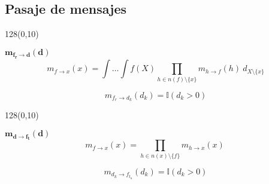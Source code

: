 \documentclass[shownotes]{beamer}
\newcommand\Wider[2][3em]{%
\makebox[\linewidth][c]{%
  \begin{minipage}{\dimexpr\textwidth+#1\relax}
  \raggedright#2
  \end{minipage}%
  }%
}
\begin{document}
\begin{frame}

\Wider[4em]{
\begin{figure}[H]
\centering
  \begin{subfigure}[b]{1\textwidth} 
  \centering
    \scalebox{0.8}{}
  \end{subfigure} 
\end{figure}
}

\pause
\vspace{0.75cm}

\Wider[4em]{
\begin{figure}[H]
\centering
  \begin{subfigure}[b]{1\textwidth} 
  \centering
    \scalebox{0.75}{}
  \end{subfigure} 
\end{figure}
}

\end{frame}

\subsection{Pasaje de mensajes}

\begin{frame}

\begin{textblock}{128}(0,10)
\begin{center}
 \large $\bm{m_{f_r \rightarrow d}(d)}$
 \vspace{0.3cm}
 \scriptsize {}
 $$m_{f \rightarrow x}(x) = \int\dots\int f(X) \prod_{h \in n(f) \setminus \{x\} } m_{h \rightarrow f}(h) \ d_{X\setminus \{x\} }$$
\end{center}
\end{textblock}
\vspace{1cm}

\begin{equation}
m_{f_r \rightarrow d_k}(d_k) = \mathbb{I}(d_k > 0)
\end{equation}
 
\end{frame}


\begin{frame}
\begin{textblock}{128}(0,10)
\begin{center}
 \large $\bm{m_{d \rightarrow f_{t}}(d)}$
 \vspace{0.3cm}
 \scriptsize {}
 $$m_{f \rightarrow x}(x) = \prod_{h \in n(x) \setminus \{f\} } m_{h \rightarrow x}(x) \ $$
\end{center}
\end{textblock}
\vspace{1cm}

\begin{equation}
m_{d_k \rightarrow f_{t_a}}(d_k) = \mathbb{I}(d_k > 0)
\end{equation}

\end{frame}
\end{document}

